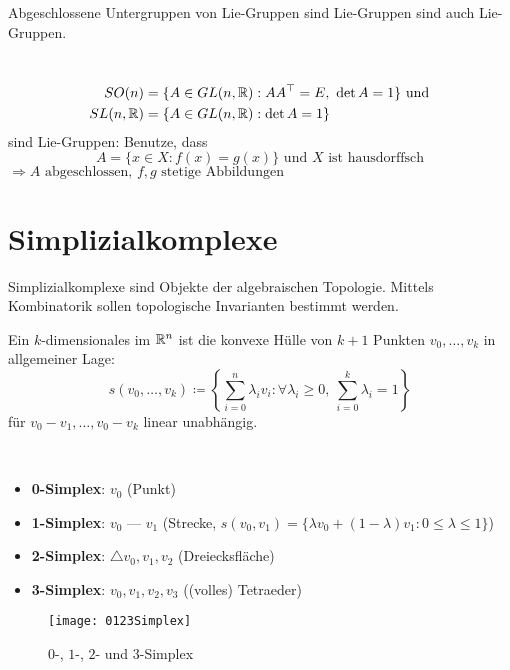 \begin{remark}
  Abgeschlossene Untergruppen von Lie-Gruppen sind Lie-Gruppen sind auch Lie-Gruppen.
\end{remark}

\begin{example}
  \
  \begin{align*}
    SO(n) &= \{ A \in GL(n, \mathbb{R}) : AA^\top = E, \ \det A = 1 \} \text{ und} \\
    SL(n, \mathbb{R}) &= \{ A \in GL(n, \mathbb{R}) : \det A = 1 \}
  \end{align*}
  sind Lie-Gruppen: Benutze, dass
  \begin{equation*}
    A = \{ x \in X : f(x) = g(x) \} \text{ und } X \text{ ist hausdorffsch}
  \end{equation*}
  \( \Rightarrow A \text{ abgeschlossen, } f, g \text{ stetige Abbildungen} \)
\end{example}

\section{Simplizialkomplexe}

Simplizialkomplexe sind Objekte der algebraischen Topologie. Mittels Kombinatorik sollen topologische Invarianten bestimmt werden.

\begin{definition}[Simplex]
  Ein \( k \)-dimensionales \label{def:simplex} im \( \mathbb{R}^n \) ist die konvexe Hülle von \( k+1 \) Punkten \( v_0, \dots, v_k \) in allgemeiner Lage:
  \begin{equation*}
    s(v_0, \dots, v_k) \coloneqq \left \{ \sum_{i=0}^n \lambda_i v_i : \forall \lambda_i \geq 0, \ \sum_{i = 0}^k \lambda_i = 1 \right \}
  \end{equation*}
  für \( v_0-v_1, \dots, v_0-v_k \) linear unabhängig.
\end{definition}

\begin{example}
  \
  \begin{itemize}
    \item \textbf{0-Simplex}: \( v_0 \) (Punkt) 
    \item \textbf{1-Simplex}: \( v_0 \) --- \( v_1 \) (Strecke, \( s(v_0, v_1) = \{ \lambda v_0 + (1-\lambda)v_1 : 0 \leq \lambda \leq 1 \} \))
    \item \textbf{2-Simplex}: \( \triangle v_0, v_1, v_2 \) (Dreiecksfläche)
    \item \textbf{3-Simplex}: \( v_0, v_1, v_2, v_3 \) ((volles) Tetraeder)
  \end{itemize}
  \begin{figure}[H]
    \texttt{[image: 0123Simplex]}
    \caption{\( 0 \)-, \( 1 \)-, \( 2 \)- und \( 3 \)-Simplex}
  \end{figure}
\end{example}


